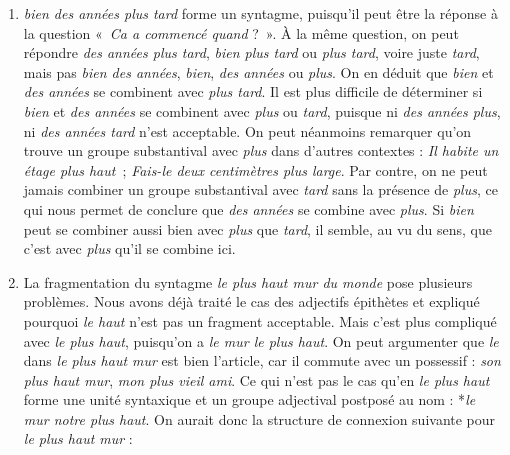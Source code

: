 { 
\begin{enumerate}[label=\alph*.]
\item \textit{bien des années plus tard} forme un syntagme, puisqu’il peut être la réponse à la question «~\textit{Ca a commencé quand} ?~». À la même question, on peut répondre \textit{des années plus tard}, \textit{bien plus tard} ou \textit{plus tard}, voire juste \textit{tard}, mais pas \textit{bien des années}, \textit{bien}, \textit{des années} ou \textit{plus}. On en déduit que \textit{bien} et \textit{des années} se combinent avec \textit{plus tard}. Il est plus difficile de déterminer si \textit{bien} et \textit{des années} se combinent avec \textit{plus} ou \textit{tard}, puisque ni \textit{des années plus}, ni \textit{des années tard} n’est acceptable. On peut néanmoins remarquer qu’on trouve un groupe substantival avec \textit{plus} dans d’autres contextes : \textit{Il habite un étage plus haut~}; \textit{Fais-le deux centimètres plus large}. Par contre, on ne peut jamais combiner un groupe substantival avec \textit{tard} sans la présence de \textit{plus}, ce qui nous permet de conclure que \textit{des années} se combine avec \textit{plus}. Si \textit{bien} peut se combiner aussi bien avec \textit{plus} que \textit{tard}, il semble, au vu du sens, que c’est avec \textit{plus} qu’il se combine ici.
   

\begin{center}
\end{center}


\item La fragmentation du syntagme \textit{le plus haut mur du monde} pose plusieurs problèmes. Nous avons déjà traité le cas des adjectifs épithètes et expliqué pourquoi \textit{le haut} n’est pas un fragment acceptable. Mais c’est plus compliqué avec \textit{le plus haut}, puisqu’on a \textit{le mur le plus haut}. On peut argumenter que \textit{le} dans \textit{le plus haut mur} est bien l’article, car il commute avec un possessif : \textit{son plus haut mur}, \textit{mon plus vieil ami}. Ce qui n’est pas le cas qu’en \textit{le plus haut} forme une unité syntaxique et un groupe adjectival postposé au nom : *\textit{le mur notre plus haut}. On aurait donc la structure de connexion suivante pour \textit{le plus haut mur} :


\end{enumerate}}
